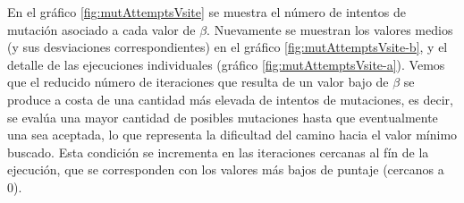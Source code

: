 En el gráfico \ref{fig:mutAttemptsVsite} se muestra el número de intentos de mutación asociado a cada valor de $\beta$.
Nuevamente se muestran los valores medios (y sus desviaciones correspondientes) en el gráfico \ref{fig:mutAttemptsVsite-b}, y el detalle de las ejecuciones individuales (gráfico \ref{fig:mutAttemptsVsite-a}).
Vemos que el reducido número de iteraciones que resulta de un valor bajo de $\beta$ se produce a costa de una cantidad más elevada de intentos de mutaciones, es decir, se evalúa una mayor cantidad de posibles mutaciones hasta 
que eventualmente una sea aceptada, lo que representa la dificultad del camino hacia el valor mínimo buscado. 
Esta condición se incrementa en las iteraciones cercanas al fín de la ejecución, que se corresponden con los valores más bajos de puntaje (cercanos a 0). 



% 
% 

